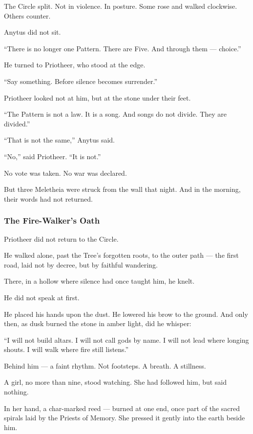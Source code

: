 \documentclass[12pt]{article}
\begin{document}
The Circle split.  
Not in violence.  
In posture.  
Some rose and walked clockwise.  
Others counter.

Anytus did not sit.

 “There is no longer one Pattern.  
 There are Five.  
 And through them — choice.”

He turned to Priotheer, who stood at the edge.

 “Say something. Before silence becomes surrender.”

Priotheer looked not at him,  
but at the stone under their feet.

 “The Pattern is not a law.  
 It is a song.  
 And songs do not divide.  
 They are divided.”

 “That is not the same,” Anytus said.

 “No,” said Priotheer. “It is not.”

No vote was taken.  
No war was declared.

But three Meletheia were struck from the wall that night.  
And in the morning, their words had not returned.

\dotfill

\subsubsection{The Fire-Walker's Oath}

Priotheer did not return to the Circle.

He walked alone, past the Tree’s forgotten roots,  
to the outer path — the first road, laid not by decree, but by faithful wandering.

There, in a hollow where silence had once taught him, he knelt.

He did not speak at first.

He placed his hands upon the dust.  
He lowered his brow to the ground.  
And only then, as dusk burned the stone in amber light, did he whisper:

 “I will not build altars.  
 I will not call gods by name.  
 I will not lead where longing shouts.  
 I will walk where fire still listens.”

Behind him — a faint rhythm.  
Not footsteps. A breath. A stillness.

A girl, no more than nine, stood watching.  
She had followed him, but said nothing.

In her hand, a char-marked reed — burned at one end,  
once part of the sacred spirals laid by the Priests of Memory.  
She pressed it gently into the earth beside him.
\end{document}
